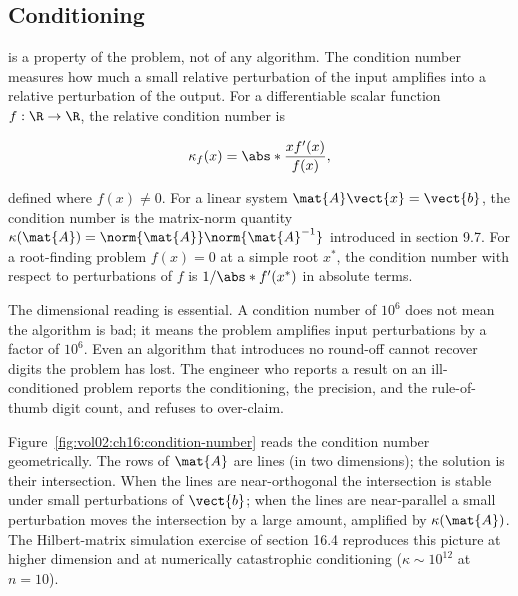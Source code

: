 \subsection{Conditioning}

 is a property of the problem, not of any
algorithm. The condition number measures how much a small relative
perturbation of the input amplifies into a relative perturbation of
the output. For a differentiable scalar function $f: \R \to \R$, the
relative condition number is

\[
\kappa_{f}(x) = \abs*{\frac{x f'(x)}{f(x)}},
\]

defined where $f(x) \neq 0$. For a linear system $\mat{A}\vect{x} =
\vect{b}$, the condition number is the matrix-norm quantity
$\kappa(\mat{A}) = \norm{\mat{A}} \norm{\mat{A}^{-1}}$ introduced
in section 9.7. For a root-finding problem $f(x) = 0$ at a simple
root $x^{*}$, the condition number with respect to perturbations of
$f$ is $1/\abs*{f'(x^{*})}$ in absolute terms.

The dimensional reading is essential. A condition number of
$10^{6}$ does not mean the algorithm is bad; it means the problem
amplifies input perturbations by a factor of $10^{6}$. Even an
algorithm that introduces no round-off cannot recover digits the
problem has lost. The engineer who reports a result on an
ill-conditioned problem reports the conditioning, the precision,
and the rule-of-thumb digit count, and refuses to over-claim.



Figure~\ref{fig:vol02:ch16:condition-number} reads the condition
number geometrically. The rows of $\mat{A}$ are lines (in two
dimensions); the solution is their intersection. When the lines are
near-orthogonal the intersection is stable under small perturbations
of $\vect{b}$; when the lines are near-parallel a small perturbation
moves the intersection by a large amount, amplified by
$\kappa(\mat{A})$. The Hilbert-matrix simulation exercise of section
16.4 reproduces this picture at higher dimension and at numerically
catastrophic conditioning ($\kappa \sim 10^{12}$ at $n = 10$).


